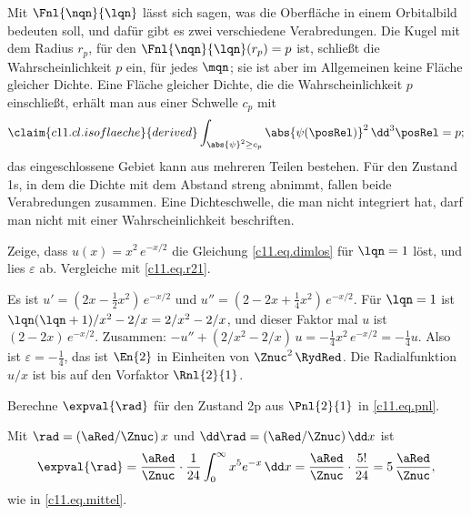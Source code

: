 \begin{vertiefung}
  Mit $\Fnl{\nqn}{\lqn}$ lässt sich sagen, was die Oberfläche in einem Orbitalbild
  bedeuten soll, und dafür gibt es zwei verschiedene Verabredungen. Die Kugel mit dem
  Radius $r_p$, für den $\Fnl{\nqn}{\lqn}(r_p) = p$ ist, schließt die Wahrscheinlichkeit
  $p$ ein, für jedes $\mqn$; sie ist aber im Allgemeinen keine Fläche gleicher Dichte.
  Eine Fläche gleicher Dichte, die die Wahrscheinlichkeit $p$ einschließt, erhält man
  aus einer Schwelle $c_p$ mit
  \begin{equation}\label{c11.eq.isoflaeche}\claim{c11.cl.isoflaeche}{derived}
    \int_{\abs{\psi}^2 \geq c_p} \abs{\psi(\posRel)}^2\,\dd^3\posRel = p ;
  \end{equation}
  das eingeschlossene Gebiet kann aus mehreren Teilen bestehen. Für den Zustand 1s, in
  dem die Dichte mit dem Abstand streng abnimmt, fallen beide Verabredungen zusammen.
  Eine Dichteschwelle, die man nicht integriert hat, darf man nicht mit einer
  Wahrscheinlichkeit beschriften.
\end{vertiefung}

\begin{exercise}\label{c11.exc.zweip}
  Zeige, dass $u(x) = x^2\,e^{-x/2}$ die Gleichung \eqref{c11.eq.dimlos} für $\lqn = 1$
  löst, und lies $\varepsilon$ ab. Vergleiche mit \eqref{c11.eq.r21}.
\end{exercise}
\begin{solution}
  Es ist $u' = (2x - \tfrac12 x^2)\,e^{-x/2}$ und
  $u'' = (2 - 2x + \tfrac14 x^2)\,e^{-x/2}$. Für $\lqn = 1$ ist
  $\lqn(\lqn + 1)/x^2 - 2/x = 2/x^2 - 2/x$, und dieser Faktor mal $u$ ist
  $(2 - 2x)\,e^{-x/2}$. Zusammen:
  $-u'' + (2/x^2 - 2/x)\,u = -\tfrac14 x^2\,e^{-x/2} = -\tfrac14 u$. Also ist
  $\varepsilon = -\tfrac14$, das ist $\En{2}$ in Einheiten von $\Znuc^2\,\RydRed$. Die
  Radialfunktion $u/x$ ist bis auf den Vorfaktor $\Rnl{2}{1}$.
\end{solution}

\begin{exercise}\label{c11.exc.mittel}
  Berechne $\expval{\rad}$ für den Zustand 2p aus $\Pnl{2}{1}$ in \eqref{c11.eq.pnl}.
\end{exercise}
\begin{solution}
  Mit $\rad = (\aRed/\Znuc)\,x$ und $\dd\rad = (\aRed/\Znuc)\,\dd x$ ist
  \begin{equation*}
    \expval{\rad} = \frac{\aRed}{\Znuc} \cdot \frac{1}{24}\int_0^\infty x^5 e^{-x}\,\dd x
    = \frac{\aRed}{\Znuc} \cdot \frac{5!}{24} = 5\,\frac{\aRed}{\Znuc},
  \end{equation*}
  wie in \eqref{c11.eq.mittel}.
\end{solution}

